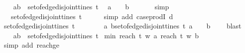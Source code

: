 \begin{isabellebody}
\ \isamarkupfalse%
\ {\isachardoublequoteopen}{\isasymforall}\ {\isacharparenleft}a{\isacharcomma}b{\isacharparenright}\ {\isasymin}\ set{\isacharunderscore}of{\isacharunderscore}edge{\isacharunderscore}disjoint{\isacharunderscore}tines\ t{\isachardot}\ \isanewline
\ a\ {\isacharequal}\ {\isacharbrackleft}{\isacharbrackright}\ {\isasymand}\ b{\isacharequal}\ {\isacharbrackleft}{\isacharbrackright}{\isachardoublequoteclose}\isanewline
\ \ \ \ \isamarkupfalse%
\ simp\isanewline
\ \ \isamarkupfalse%
\ \isamarkupfalse%
\ {\isachardoublequoteopen}{\isacharparenleft}{\isacharbrackleft}{\isacharbrackright}{\isacharcomma}{\isacharbrackleft}{\isacharbrackright}{\isacharparenright}\ {\isasymin}\ set{\isacharunderscore}of{\isacharunderscore}edge{\isacharunderscore}disjoint{\isacharunderscore}tines\ t{\isachardoublequoteclose}\isanewline
\ \ \ \ \isamarkupfalse%
\ {\isacharparenleft}simp\ add{\isacharcolon}\ case{\isacharunderscore}prodI\ d{\isacharparenright}\isanewline
\ \ \isamarkupfalse%
\ \isamarkupfalse%
\ {\isachardoublequoteopen}set{\isacharunderscore}of{\isacharunderscore}edge{\isacharunderscore}disjoint{\isacharunderscore}tines\ t\ {\isacharequal}\ {\isacharbraceleft}{\isacharparenleft}{\isacharbrackleft}{\isacharbrackright}{\isacharcomma}{\isacharbrackleft}{\isacharbrackright}{\isacharparenright}{\isacharbraceright}{\isachardoublequoteclose}\isanewline
\ \ \ \ \isamarkupfalse%
\ {\isacartoucheopen}{\isasymforall}{\isacharparenleft}a{\isacharcomma}\ b{\isacharparenright}{\isasymin}set{\isacharunderscore}of{\isacharunderscore}edge{\isacharunderscore}disjoint{\isacharunderscore}tines\ t{\isachardot}\ a\ {\isacharequal}\ {\isacharbrackleft}{\isacharbrackright}\ {\isasymand}\ b\ {\isacharequal}\ {\isacharbrackleft}{\isacharbrackright}{\isacartoucheclose}\ \isamarkupfalse%
\ blast\isanewline
\ \ \isamarkupfalse%
\ \isamarkupfalse%
\ {\isachardoublequoteopen}{\isasymexists}\ {\isacharparenleft}a{\isacharcomma}b{\isacharparenright}\ {\isasymin}\ set{\isacharunderscore}of{\isacharunderscore}edge{\isacharunderscore}disjoint{\isacharunderscore}tines\ t{\isachardot}\ \isanewline
min\ {\isacharparenleft}reach\ t\ w\ a{\isacharparenright}\ {\isacharparenleft}reach\ t\ w\ b{\isacharparenright}\ {\isasymge}\ {}{\isachardoublequoteclose}\isanewline
\ \ \ \ \isamarkupfalse%
\ {\isacharparenleft}simp\ add{\isacharcolon}\ reachge{}{\isacharparenright}\isanewline

\end{isabellebody}
